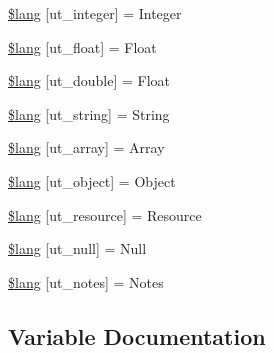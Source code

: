 \begin{DoxyCompactItemize}
\mbox{\hyperlink{unit__test__lang_8php_ae2207197dd3d32f76d11c013d7166726}{\$lang}} \mbox{[}\textquotesingle{}ut\+\_\+integer\textquotesingle{}\mbox{]} = \textquotesingle{}Integer\textquotesingle{}
\item 
\mbox{\hyperlink{unit__test__lang_8php_af422c13e8dc0e7c45278a2013aa6a52a}{\$lang}} \mbox{[}\textquotesingle{}ut\+\_\+float\textquotesingle{}\mbox{]} = \textquotesingle{}Float\textquotesingle{}
\item 
\mbox{\hyperlink{unit__test__lang_8php_af34c0760602a4c8bb68970452fef8558}{\$lang}} \mbox{[}\textquotesingle{}ut\+\_\+double\textquotesingle{}\mbox{]} = \textquotesingle{}Float\textquotesingle{}
\item 
\mbox{\hyperlink{unit__test__lang_8php_ae8e448c917f05ad02b9796a5f7d0bc2d}{\$lang}} \mbox{[}\textquotesingle{}ut\+\_\+string\textquotesingle{}\mbox{]} = \textquotesingle{}String\textquotesingle{}
\item 
\mbox{\hyperlink{unit__test__lang_8php_a427e1ed9e9f885355a4fb12929245174}{\$lang}} \mbox{[}\textquotesingle{}ut\+\_\+array\textquotesingle{}\mbox{]} = \textquotesingle{}Array\textquotesingle{}
\item 
\mbox{\hyperlink{unit__test__lang_8php_af7a438e0124ac3a711af5942e52b757a}{\$lang}} \mbox{[}\textquotesingle{}ut\+\_\+object\textquotesingle{}\mbox{]} = \textquotesingle{}Object\textquotesingle{}
\item 
\mbox{\hyperlink{unit__test__lang_8php_aee89857218dd461be5741f7dceac4cda}{\$lang}} \mbox{[}\textquotesingle{}ut\+\_\+resource\textquotesingle{}\mbox{]} = \textquotesingle{}Resource\textquotesingle{}
\item 
\mbox{\hyperlink{unit__test__lang_8php_afb6ad5c6347afd6350e76a0e75f7bd76}{\$lang}} \mbox{[}\textquotesingle{}ut\+\_\+null\textquotesingle{}\mbox{]} = \textquotesingle{}Null\textquotesingle{}
\item 
\mbox{\hyperlink{unit__test__lang_8php_a0ccef0589600cd31d3a964c9f3721b20}{\$lang}} \mbox{[}\textquotesingle{}ut\+\_\+notes\textquotesingle{}\mbox{]} = \textquotesingle{}Notes\textquotesingle{}
\end{DoxyCompactItemize}


\subsection{Variable Documentation}
\mbox{\label{unit__test__lang_8php_a81799dc131f89840fd4ff4bc7c0afc94}} 
